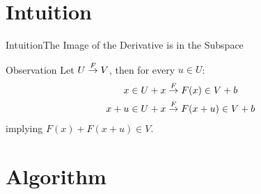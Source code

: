 \section{Intuition}
\begin{frame}{Intuition}{The Image of the Derivative is in the Subspace}
    \begin{block}{Observation}
        Let $U \stackrel{F}{\rightarrow} V$, then for every $u \in U$:
        \begin{align*}
            x \in U + x &\stackrel{F}{\rightarrow} F(x) \in V + b \\
            x+u \in U + x &\stackrel{F}{\rightarrow} F(x+u) \in V + b
        \end{align*}
        implying $F(x) + F(x + u) \in V$.
    \end{block}
\end{frame}

\section{Algorithm}
